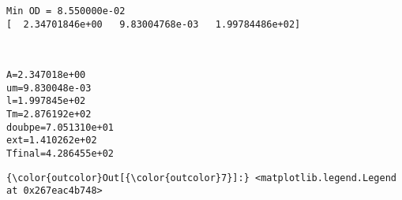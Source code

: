 \documentclass[11pt]{article}
\begin{document}
    \begin{Verbatim}[commandchars=\\\{\}]
Min OD = 8.550000e-02
[  2.34701846e+00   9.83004768e-03   1.99784486e+02]

    \end{Verbatim}

    \begin{center}
    \end{center}
    { \hspace*{\fill} \\}
    
    \begin{Verbatim}[commandchars=\\\{\}]
A=2.347018e+00
um=9.830048e-03
l=1.997845e+02
Tm=2.876192e+02
doubpe=7.051310e+01
ext=1.410262e+02
Tfinal=4.286455e+02

    \end{Verbatim}

            \begin{Verbatim}[commandchars=\\\{\}]
{\color{outcolor}Out[{\color{outcolor}7}]:} <matplotlib.legend.Legend at 0x267eac4b748>
\end{Verbatim}
        
    \begin{center}
    \end{center}
    { \hspace*{\fill} \\}
    
    \begin{center}
    \end{center}
    { \hspace*{\fill} \\}
    
\end{document}

